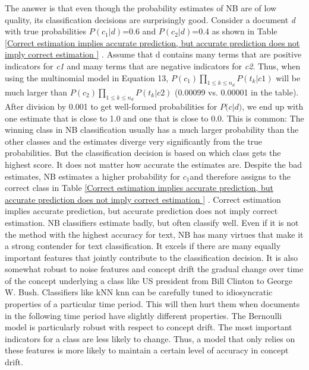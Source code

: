 \documentclass[journal]{IEEEtran}
\begin{document}
The answer is that even though the probability estimates of NB are of low quality, its classification decisions are surprisingly good. Consider a document \textit{d} with true probabilities $P(c_{1}|d)$=0.6 and $P(c_{2}|d)$=0.4 as shown in Table \ref{Correct estimation implies accurate prediction, but accurate prediction does not imply correct estimation } . Assume that d contains many terms that are positive indicators for \textit{c1} and many terms that are negative indicators for \textit{c2}. Thus, when using the multinomial model in Equation 13, $P(c_{1})\prod_{1\le k \le n_{d}}P(t_{k}|c1)$ will be much larger than $P(c_{2})\prod_{1\le k \le n_{d}}P(t_{k}|c2)$ (0.00099 vs. 0.00001 in the table). After division by 0.001 to get well-formed probabilities for $\textit{P(c|d)}$, we end up with one estimate that is close to 1.0 and one that is close to 0.0. This is common: The winning class in NB classification usually has a much larger probability than the other classes and the estimates diverge very significantly from the true probabilities. But the classification decision is based on which class gets the highest score. It does not matter how accurate the estimates are. Despite the bad estimates, NB estimates a higher probability for \textit{$c_{1}$}and therefore assigns to the correct class in Table \ref{Correct estimation implies accurate prediction, but accurate prediction does not imply correct estimation } . Correct estimation implies accurate prediction, but accurate prediction does not imply correct estimation. NB classifiers estimate badly, but often classify well. \newline
Even if it is not the method with the highest accuracy for text, NB has many virtues that make it a strong contender for text classification. It excels if there are many equally important features that jointly contribute to the classification decision. It is also somewhat robust to noise features and concept drift \textendash\hspace{0.04in} the gradual change over time of the concept underlying a class like US president from Bill Clinton to George W. Bush. Classifiers like kNN knn can be carefully tuned to idiosyncratic properties of a particular time period. This will then hurt them when documents in the following time period have slightly different properties.\newline
The Bernoulli model is particularly robust with respect to concept drift. The most important indicators for a class are less likely to change. Thus, a model that only relies on these features is more likely to maintain a certain level of accuracy in concept drift.
\end{document}
